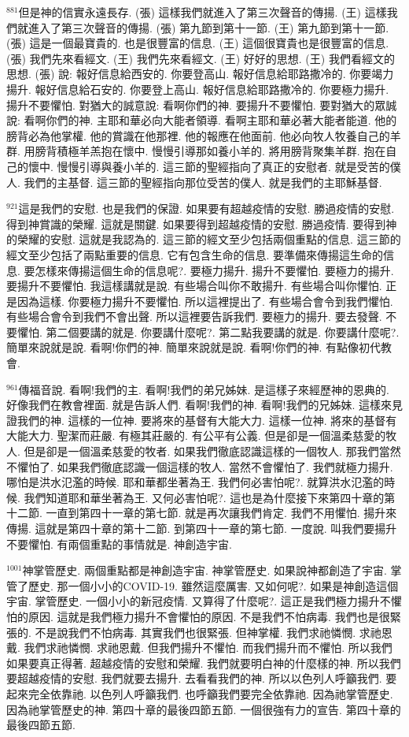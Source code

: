 \documentclass{book}
\begin{document}
$^{881}$但是神的信實永遠長存.
(張) 這樣我們就進入了第三次聲音的傳揚.
(王) 這樣我們就進入了第三次聲音的傳揚.
(張) 第九節到第十一節.
(王) 第九節到第十一節.
(張) 這是一個最寶貴的.
也是很豐富的信息.
(王) 這個很寶貴也是很豐富的信息.
(張) 我們先來看經文.
(王) 我們先來看經文.
(王) 好好的思想.
(王) 我們看經文的思想.
(張) 說: 報好信息給西安的.
你要登高山.
報好信息給耶路撒冷的.
你要竭力揚升.
報好信息給石安的.
你要登上高山.
報好信息給耶路撒冷的.
你要極力揚升.
揚升不要懼怕.
對猶大的誠意說: 看啊你們的神.
要揚升不要懼怕.
要對猶大的眾誠說: 看啊你們的神.
主耶和華必向大能者領導.
看啊主耶和華必著大能者能道.
他的膀背必為他掌權.
他的賞識在他那裡.
他的報應在他面前.
他必向牧人牧養自己的羊群.
用膀背積極羊羔抱在懷中.
慢慢引導那如養小羊的.
將用膀背聚集羊群.
抱在自己的懷中.
慢慢引導與養小羊的.
這三節的聖經指向了真正的安慰者.
就是受苦的僕人.
我們的主基督.
這三節的聖經指向那位受苦的僕人.
就是我們的主耶穌基督.

$^{921}$這是我們的安慰.
也是我們的保證.
如果要有超越疫情的安慰.
勝過疫情的安慰.
得到神賞識的榮耀.
這就是關鍵.
如果要得到超越疫情的安慰.
勝過疫情.
要得到神的榮耀的安慰.
這就是我認為的.
這三節的經文至少包括兩個重點的信息.
這三節的經文至少包括了兩點重要的信息.
它有包含生命的信息.
要準備來傳揚這生命的信息.
要怎樣來傳揚這個生命的信息呢?.
要極力揚升.
揚升不要懼怕.
要極力的揚升.
要揚升不要懼怕.
我這樣講就是說.
有些場合叫你不敢揚升.
有些場合叫你懼怕.
正是因為這樣.
你要極力揚升不要懼怕.
所以這裡提出了.
有些場合會令到我們懼怕.
有些場合會令到我們不會出聲.
所以這裡要告訴我們.
要極力的揚升.
要去發聲.
不要懼怕.
第二個要講的就是.
你要講什麼呢?.
第二點我要講的就是.
你要講什麼呢?.
簡單來說就是說.
看啊!你們的神.
簡單來說就是說.
看啊!你們的神.
有點像初代教會.

$^{961}$傳福音說.
看啊!我們的主.
看啊!我們的弟兄姊妹.
是這樣子來經歷神的恩典的.
好像我們在教會裡面.
就是告訴人們.
看啊!我們的神.
看啊!我們的兄姊妹.
這樣來見證我們的神.
這樣的一位神.
要將來的基督有大能大力.
這樣一位神.
將來的基督有大能大力.
聖潔而莊嚴.
有極其莊嚴的.
有公平有公義.
但是卻是一個溫柔慈愛的牧人.
但是卻是一個溫柔慈愛的牧者.
如果我們徹底認識這樣的一個牧人.
那我們當然不懼怕了.
如果我們徹底認識一個這樣的牧人.
當然不會懼怕了.
我們就極力揚升.
哪怕是洪水氾濫的時候.
耶和華都坐著為王.
我們何必害怕呢?.
就算洪水氾濫的時候.
我們知道耶和華坐著為王.
又何必害怕呢?.
這也是為什麼接下來第四十章的第十二節.
一直到第四十一章的第七節.
就是再次讓我們肯定.
我們不用懼怕.
揚升來傳揚.
這就是第四十章的第十二節.
到第四十一章的第七節.
一度說.
叫我們要揚升不要懼怕.
有兩個重點的事情就是.
神創造宇宙.

$^{1001}$神掌管歷史.
兩個重點都是神創造宇宙.
神掌管歷史.
如果說神都創造了宇宙.
掌管了歷史.
那一個小小的COVID-19.
雖然這麼厲害.
又如何呢?.
如果是神創造這個宇宙.
掌管歷史.
一個小小的新冠疫情.
又算得了什麼呢?.
這正是我們極力揚升不懼怕的原因.
這就是我們極力揚升不會懼怕的原因.
不是我們不怕病毒.
我們也是很緊張的.
不是說我們不怕病毒.
其實我們也很緊張.
但神掌權.
我們求祂憐憫.
求祂恩戴.
我們求祂憐憫.
求祂恩戴.
但我們揚升不懼怕.
而我們揚升而不懼怕.
所以我們如果要真正得著.
超越疫情的安慰和榮耀.
我們就要明白神的什麼樣的神.
所以我們要超越疫情的安慰.
我們就要去揚升.
去看看我們的神.
所以以色列人呼籲我們.
要起來完全依靠祂.
以色列人呼籲我們.
也呼籲我們要完全依靠祂.
因為祂掌管歷史.
因為祂掌管歷史的神.
第四十章的最後四節五節.
一個很強有力的宣告.
第四十章的最後四節五節.
\end{document}
